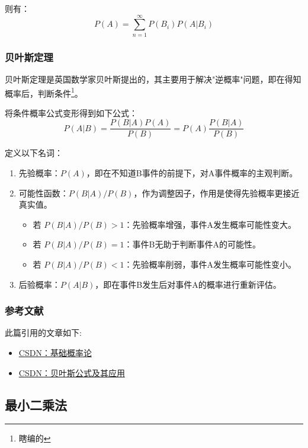 则有：
\begin{equation}
    P(A) = \sum_{n=1}^{\infty} P(B_i) P(A|B_i) 
\end{equation}

\subsubsection{贝叶斯定理}

贝叶斯定理是英国数学家贝叶斯提出的，其主要用于解决"逆概率"问题，即在得知概率后，判断条件\footnote{瞎编的}。

将条件概率公式变形得到如下公式：
\begin{equation}
    P(A|B) = \frac{P(B|A)P(A)}{P(B)} = P(A)\frac{P(B|A)}{P(B)}
\end{equation}

定义以下名词：
\begin{enumerate}
    \item 先验概率：$P(A)$，即在不知道B事件的前提下，对A事件概率的主观判断。
    \item 可能性函数：$P(B|A)/P(B)$，作为调整因子，作用是使得先验概率更接近真实值。
    \begin{itemize}
        \item 若 $P(B|A)/P(B)>1$：先验概率增强，事件A发生概率可能性变大。
        \item 若 $P(B|A)/P(B)=1$：事件B无助于判断事件A的可能性。
        \item 若 $P(B|A)/P(B)<1$：先验概率削弱，事件A发生概率可能性变小。
    \end{itemize}
    \item 后验概率：$P(A|B)$，即在事件B发生后对事件A的概率进行重新评估。
\end{enumerate}

\subsubsection{参考文献}
此篇引用的文章如下:
\begin{itemize}
    \item \href{https://blog.csdn.net/qq_31073871/article/details/81077386}{CSDN：基础概率论}
    \item \href{https://blog.csdn.net/qq_41529692/article/details/84105315}{CSDN：贝叶斯公式及其应用}
\end{itemize}

\subsection{最小二乘法}
